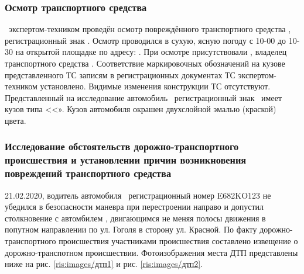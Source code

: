 	\subsubsection{Осмотр транспортного средства}
	
   \osm\, экспертом-техником проведён осмотр повреждённого транспортного средства \tc, регистрационный знак \grz. Осмотр проводился в сухую, ясную погоду с 10-00  до 10-30 на открытой площадке   по адресу: .  При осмотре присутствовали , владелец транспортного средства .  Соответствие маркировочных обозначений на кузове представленного ТС записям в регистрационных документах ТС экспертом-техником установлено. Видимые изменения конструкции ТС отсутствуют. Представленный на исследование автомобиль \, регистрационный знак \, имеет кузов типа <<». Кузов автомобиля окрашен двухслойной   %
   эмалью (краской)  \colr \, цвета.
   
                       
\subsubsection{Исследование обстоятельств дорожно-транспортного происшествия и установлении причин возникновения повреждений транспортного средства}
          
    21.02.2020, водитель автомобиля \tca\, регистрационный номер E682KO123 не убедился в безопасности маневра при перестроении направо и допустил столкновение с автомбилем , двигающимся не меняя полосы движения в попутном направлении  по ул. Гоголя в сторону ул. Красной. По факту дорожно-транспортного происшествия участниками происшествия  составлено извещение о дорожно-транспотном происшествии. Фотоизображения места ДТП представлены ниже на рис. \ref{ris:images/дтп1} и рис. \ref{ris:images/дтп2}.
    
